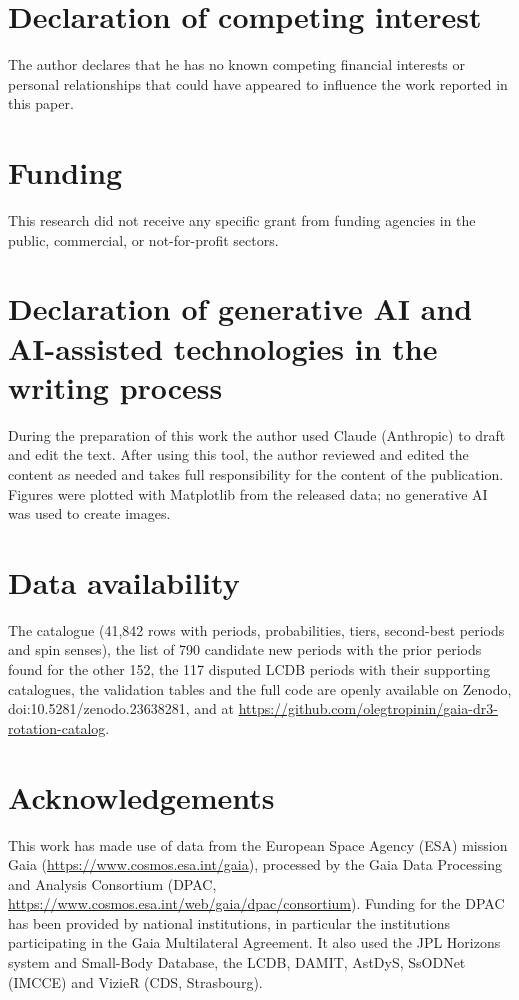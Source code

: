 \documentclass[preprint,12pt,authoryear]{elsarticle}
\begin{document}
\section*{Declaration of competing interest}
The author declares that he has no known competing financial interests or personal relationships that could
have appeared to influence the work reported in this paper.

\section*{Funding}
This research did not receive any specific grant from funding agencies in the public, commercial, or
not-for-profit sectors.

\section*{Declaration of generative AI and AI-assisted technologies in the writing process}
During the preparation of this work the author used Claude (Anthropic) to draft and edit the text. After
using this tool, the author reviewed and edited the content as needed and takes full responsibility for the
content of the publication. Figures were plotted with Matplotlib from the released data; no generative AI
was used to create images.

\section*{Data availability}
The catalogue \citep{Tropynin2026b} (41{,}842 rows with periods, probabilities, tiers, second-best periods
and spin senses), the list of 790 candidate new periods with the prior periods found for the other 152, the
117 disputed LCDB periods with their supporting catalogues, the validation tables and the full code are
openly available on Zenodo, doi:10.5281/zenodo.23638281, and at
\url{https://github.com/olegtropinin/gaia-dr3-rotation-catalog}.

\section*{Acknowledgements}
This work has made use of data from the European Space Agency (ESA) mission Gaia
(\url{https://www.cosmos.esa.int/gaia}), processed by the Gaia Data Processing and Analysis Consortium (DPAC,
\url{https://www.cosmos.esa.int/web/gaia/dpac/consortium}). Funding for the DPAC has been provided by national
institutions, in particular the institutions participating in the Gaia Multilateral Agreement. It also used
the JPL Horizons system and Small-Body Database, the LCDB, DAMIT, AstDyS, SsODNet (IMCCE) and VizieR (CDS, Strasbourg).


\end{document}
